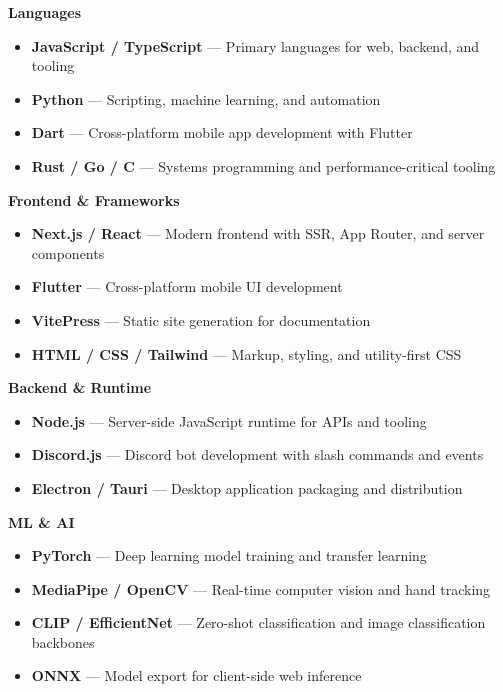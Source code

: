 \documentclass[letterpaper,11pt]{article}
\begin{document}
\textbf{Languages}
\begin{itemize}[leftmargin=0.15in, label={--}]
    \small
    \item \textbf{JavaScript / TypeScript} --- Primary languages for web, backend, and tooling
    \item \textbf{Python} --- Scripting, machine learning, and automation
    \item \textbf{Dart} --- Cross-platform mobile app development with Flutter
    \item \textbf{Rust / Go / C} --- Systems programming and performance-critical tooling
\end{itemize}

\textbf{Frontend \& Frameworks}
\begin{itemize}[leftmargin=0.15in, label={--}]
    \small
    \item \textbf{Next.js / React} --- Modern frontend with SSR, App Router, and server components
    \item \textbf{Flutter} --- Cross-platform mobile UI development
    \item \textbf{VitePress} --- Static site generation for documentation
    \item \textbf{HTML / CSS / Tailwind} --- Markup, styling, and utility-first CSS
\end{itemize}

\textbf{Backend \& Runtime}
\begin{itemize}[leftmargin=0.15in, label={--}]
    \small
    \item \textbf{Node.js} --- Server-side JavaScript runtime for APIs and tooling
    \item \textbf{Discord.js} --- Discord bot development with slash commands and events
    \item \textbf{Electron / Tauri} --- Desktop application packaging and distribution
\end{itemize}

\textbf{ML \& AI}
\begin{itemize}[leftmargin=0.15in, label={--}]
    \small
    \item \textbf{PyTorch} --- Deep learning model training and transfer learning
    \item \textbf{MediaPipe / OpenCV} --- Real-time computer vision and hand tracking
    \item \textbf{CLIP / EfficientNet} --- Zero-shot classification and image classification backbones
    \item \textbf{ONNX} --- Model export for client-side web inference
\end{itemize}
\end{document}
